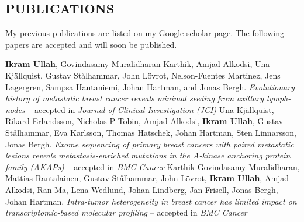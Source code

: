 \documentclass[margin, 10pt]{res} %
\begin{document}
\begin{resume}
\section{PUBLICATIONS} 
My previous publications are listed on my \href{https://scholar.google.com/citations?user=HjM0XDoAAAAJ&hl=en}{Google scholar page}. The following papers are accepted and will soon be published.
\begingroup
\renewcommand{\section}[2]{}%
\begin{thebibliography}{}
    \textbf{Ikram Ullah}, Govindasamy-Muralidharan Karthik, Amjad Alkodsi, Una Kj\"allquist, Gustav St\aa lhammar, John L\"ovrot, Nelson-Fuentes Martinez, Jens Lagergren, Sampsa Hautaniemi, Johan Hartman, and Jonas Bergh. \textit{Evolutionary history of metastatic breast cancer reveals minimal seeding from axillary lymph-nodes} -- accepted in {\sl Journal of Clinical Investigation (JCI)}
    Una Kj\"allquist, Rikard Erlandsson, Nicholas P Tobin, Amjad Alkodsi, \textbf{Ikram Ullah}, Gustav St\aa lhammar, Eva Karlsson, Thomas Hatschek, Johan Hartman, Sten Linnarsson, Jonas Bergh. \textit{Exome sequencing of primary breast cancers with paired metastatic lesions reveals metastasis-enriched mutations in the A-kinase anchoring protein family (AKAPs)} -- accepted in {\sl BMC Cancer}
    Karthik Govindasamy Muralidharan, Mattias Rantalainen, Gustav St\aa lhammar, John L\"ovrot, \textbf{Ikram Ullah}, Amjad Alkodsi, Ran Ma, Lena Wedlund, Johan Lindberg, Jan Frisell, Jonas Bergh, Johan Hartman. \textit{Intra-tumor heterogeneity in breast cancer has limited impact on transcriptomic-based molecular profiling} -- accepted in {\sl BMC Cancer}
\end{thebibliography}
\endgroup




\end{resume}
\end{document}
